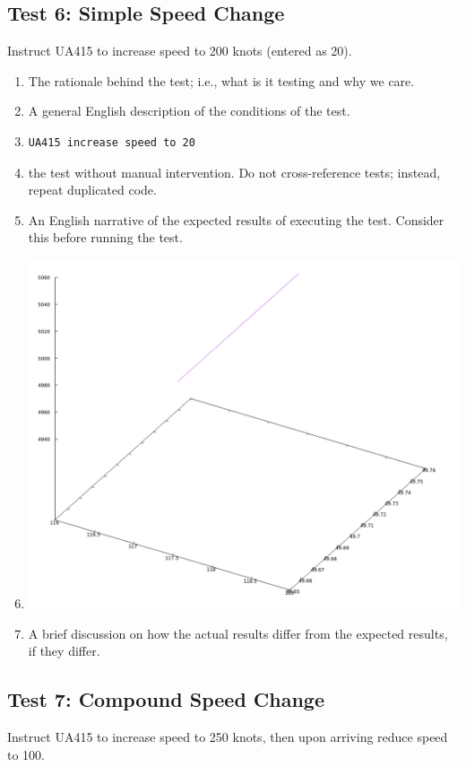\documentclass[letterpaper, 12pt]{article}
\begin{document}
\subsection{Test 6: Simple Speed Change}
Instruct UA415 to increase speed to 200 knots (entered as 20).
\begin{enumerate}
\item The rationale behind the test; i.e., what is it testing and why we care.
\item A general English description of the conditions of the test.
\item \begin{verbatim}UA415 increase speed to 20\end{verbatim}
\item the test without manual intervention. Do not cross-reference tests; instead, repeat duplicated code.
\item An English narrative of the expected results of executing the test. Consider this before running the test.
\item \includegraphics[scale=.4,valign=t]{test6.png}
\item A brief discussion on how the actual results differ from the expected results, if they differ.
\end{enumerate}

\subsection{Test 7: Compound Speed Change}
Instruct UA415 to increase speed to 250 knots, then upon arriving reduce speed to 100.
\end{document}
